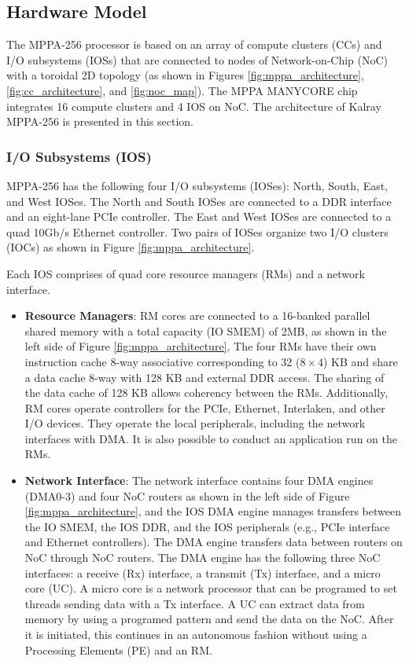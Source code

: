 \documentclass{sig-alternate-05-2015}
\begin{document}
\subsection{Hardware Model}
\label{sec:hardware_model}
The MPPA-256 processor is based on an array of compute clusters (CCs) and I/O subsystems (IOSs) that are connected to nodes of Network-on-Chip (NoC) with a toroidal 2D topology 
(as shown in Figures \ref{fig:mppa_architecture}, \ref{fig:cc_architecture}, and \ref{fig:noc_map}).
The MPPA MANYCORE chip integrates 16 compute clusters and 4 IOS on NoC.
The architecture of Kalray MPPA-256 is presented in this section.

\subsubsection{I/O Subsystems (IOS)}
\label{sec:ios}
MPPA-256 has the following four I/O subsystems (IOSes): North, South, East, and West IOSes.
The North and South IOSes are connected to a DDR interface and an eight-lane PCIe controller.
The East and West IOSes are connected to a quad 10Gb/s Ethernet controller.
Two pairs of IOSes organize two I/O clusters (IOCs) as shown in Figure \ref{fig:mppa_architecture}.

Each IOS comprises of quad core resource managers (RMs) and a network interface.
\begin{itemize}
\item \textbf{Resource Managers}: RM cores are connected to a 16-banked parallel shared memory with a total capacity (IO SMEM) of 2MB, as shown in the left side of Figure \ref{fig:mppa_architecture},
The four RMs have their own instruction cache 8-way associative corresponding to 32 ($8 \times 4$) KB and share a data cache 8-way with 128 KB and external DDR access.
The sharing of the data cache of 128 KB allows coherency between the RMs.
Additionally, RM cores operate controllers for the PCIe, Ethernet, Interlaken, and other I/O devices.
They operate the local peripherals, including the network interfaces with DMA.
It is also possible to conduct an application run on the RMs.
\item \textbf{Network Interface}: The network interface contains four DMA engines (DMA0-3) and four NoC routers as shown in the left side of Figure \ref{fig:mppa_architecture}, and the IOS DMA engine manages transfers between the IO SMEM, the IOS DDR, and the IOS peripherals (e.g., PCIe interface and Ethernet controllers).
The DMA engine transfers data between routers on NoC through NoC routers.
The DMA engine has the following three NoC interfaces: a receive (Rx) interface, a transmit (Tx) interface, and a micro core (UC).
A micro core is a network processor that can be programed to set threads sending data with a Tx interface.
A UC can extract data from memory by using a programed pattern and send the data on the NoC.
After it is initiated, this continues in an autonomous fashion without using a Processing Elements (PE) and an RM.
\end{itemize}
\end{document}
